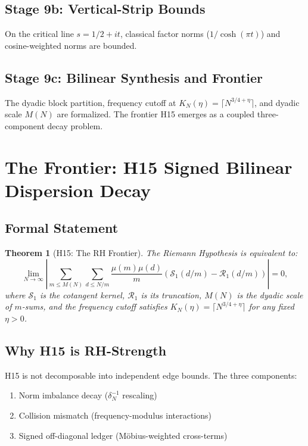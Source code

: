 \documentclass[11pt,a4paper]{article}
\theoremstyle{plain}
\newtheorem{theorem}{Theorem}[section]
\theoremstyle{definition}
\theoremstyle{remark}
\begin{document}
\subsection{Stage 9b: Vertical-Strip Bounds}

On the critical line $s = 1/2 + it$, classical factor norms ($1/\cosh(\pi t)$) and cosine-weighted norms are bounded.

\subsection{Stage 9c: Bilinear Synthesis and Frontier}

The dyadic block partition, frequency cutoff at $K_N(\eta) = \lceil N^{3/4+\eta} \rceil$, and dyadic scale $M(N)$ are formalized. The frontier H15 emerges as a coupled three-component decay problem.

\section{The Frontier: H15 Signed Bilinear Dispersion Decay}
\label{sec:frontier}

\subsection{Formal Statement}

\begin{theorem}[H15: The RH Frontier]\label{thm:h15}
The Riemann Hypothesis is equivalent to:
\[
\lim_{N \to \infty} \left| \sum_{m \le M(N)} \sum_{d \le N/m} \frac{\mu(m)\mu(d)}{m} \left( \mathcal{S}_1(d/m) - \mathcal{R}_1(d/m) \right) \right| = 0,
\]
where $\mathcal{S}_1$ is the cotangent kernel, $\mathcal{R}_1$ is its truncation, $M(N)$ is the dyadic scale of $m$-sums, and the frequency cutoff satisfies $K_N(\eta) = \lceil N^{3/4+\eta} \rceil$ for any fixed $\eta > 0$.
\end{theorem}

\subsection{Why H15 is RH-Strength}

H15 is not decomposable into independent edge bounds. The three components:
\begin{enumerate}[label=(\roman*)]
  \item Norm imbalance decay ($\delta_N^{-1}$ rescaling)
  \item Collision mismatch (frequency-modulus interactions)
  \item Signed off-diagonal ledger (Möbius-weighted cross-terms)
\end{enumerate}
\end{document}
